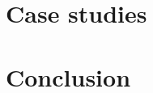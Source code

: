 \documentclass[hyperref={pdfpagelabels=false}]{beamer}
\begin{document}
  \section{Case studies}

  \section{Conclusion}
\end{document}
